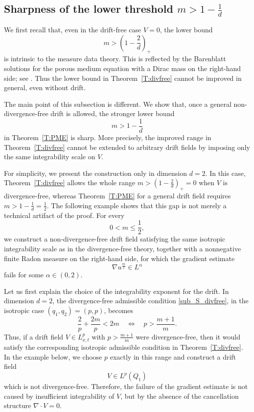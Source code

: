 \documentclass{amsart}
\numberwithin{equation}{section}
\begin{document}
\subsection{Sharpness of the lower threshold \(m>1-\frac{1}{d}\)}
\label{S:sharpness-lower}


We first recall that, even in the drift-free case \(V=0\), the lower bound
\[
m>\left(1-\frac{2}{d}\right)_+
\]
is intrinsic to the measure data theory. This is reflected by the Barenblatt solutions for the porous medium equation with a Dirac mass on the right-hand side; see \cite{BDG13,BDG15}. Thus the lower bound in Theorem~\ref{T:divfree} cannot be improved in general, even without drift.


The main point of this subsection is different. We show that, once a general non-divergence-free drift is allowed, the stronger lower bound
\[
m>1-\frac{1}{d}
\]
in Theorem~\ref{T:PME} is sharp. More precisely, the improved range in Theorem~\ref{T:divfree} cannot be extended to arbitrary drift fields by imposing only the same integrability scale on \(V\).


For simplicity, we present the construction only in dimension \(d=2\). In this case, Theorem~\ref{T:divfree} allows the whole range
\(
m>\left(1-\frac{2}{d}\right)_+=0
\)
when \(V\) is divergence-free, whereas Theorem~\ref{T:PME} for a general drift field requires
\(
m>1-\frac{1}{d}=\frac{1}{2}.
\)
The following example shows that this gap is not merely a technical artifact of the proof. For every
\[
0<m\le \frac{1}{2},
\]
we construct a non-divergence-free drift field satisfying the same isotropic integrability scale as in the divergence-free theory, together with a nonnegative finite Radon measure on the right-hand side, for which the gradient estimate
\[
\nabla u^{\frac{m}{2}}\in L^\alpha
\]
fails for some \(\alpha\in(0,2)\).




Let us first explain the choice of the integrability exponent for the drift.
In
dimension \(d=2\), the divergence-free admissible condition
\eqref{sub_S_divfree}, in the isotropic case 
\((q_1,q_2)=(p,p)\), becomes
\begin{equation}\label{isotropic_p}
\frac{2}{p}+\frac{2m}{p}<2m
\quad \Longleftrightarrow \quad
p>\frac{m+1}{m}.
\end{equation}
Thus, if a drift field \(V\in L^p_{x,t}\) with
\(p>\frac{m+1}{m}\) were divergence-free, then it would satisfy the
corresponding isotropic admissible condition in Theorem~\ref{T:divfree}.
In the example below, we choose \(p\) exactly in this range and construct a
drift field
\[
V\in L^p(Q_1)
\]
which is not divergence-free. Therefore, the failure of the gradient estimate
is not caused by insufficient integrability of \(V\), but by the absence of
the cancellation structure \(\nabla\cdot V=0\).
\end{document}
